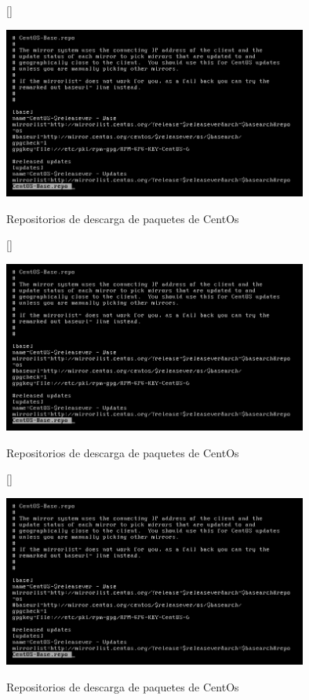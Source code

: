 \documentclass[11pt]{article}
\begin{document}
\begin{figure}[ht]
[\FBwidth]
{\caption{Repositorios de descarga de paquetes de CentOs}\label{fig:repositorios}}
{\includegraphics[width=10cm]{screenshots/httpd-install/repositorios-centos.png}}
\end{figure}

\begin{figure}[ht]
[\FBwidth]
{\caption{Repositorios de descarga de paquetes de CentOs}\label{fig:repositorios}}
{\includegraphics[width=10cm]{screenshots/httpd-install/repositorios-centos.png}}
\end{figure}

\begin{figure}[ht]
[\FBwidth]
{\caption{Repositorios de descarga de paquetes de CentOs}\label{fig:repositorios}}
{\includegraphics[width=10cm]{screenshots/httpd-install/repositorios-centos.png}}
\end{figure}
\end{document}
